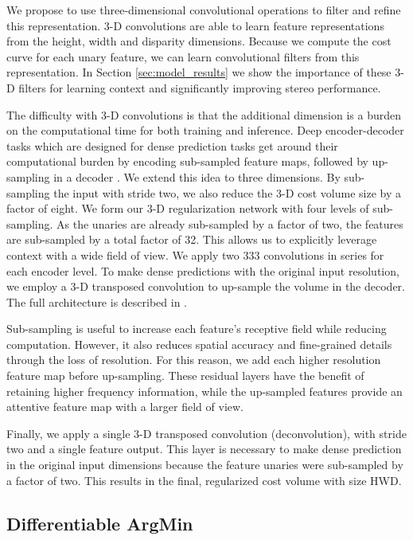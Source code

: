 \documentclass[10pt,twocolumn,letterpaper]{article}
\begin{document}
We propose to use three-dimensional convolutional operations to filter and refine this representation. 3-D convolutions are able to learn feature representations from the height, width and disparity dimensions. Because we compute the cost curve for each unary feature, we can learn convolutional filters from this representation. In Section \ref{sec:model_results} we show the importance of these 3-D filters for learning context and significantly improving stereo performance.



The difficulty with 3-D convolutions is that the additional dimension is a burden on the computational time for both training and inference. Deep encoder-decoder tasks which are designed for dense prediction tasks get around their computational burden by encoding sub-sampled feature maps, followed by up-sampling in a decoder \cite{badrinarayanan2015segnet}. We extend this idea to three dimensions. By sub-sampling the input with stride two, we also reduce the 3-D cost volume size by a factor of eight. We form our 3-D regularization network with four levels of sub-sampling. As the unaries are already sub-sampled by a factor of two, the features are sub-sampled by a total factor of 32. This allows us to explicitly leverage context with a wide field of view. We apply two 333 convolutions in series for each encoder level. To make dense predictions with the original input resolution, we employ a 3-D transposed convolution to up-sample the volume in the decoder. The full architecture is described in .

Sub-sampling is useful to increase each feature's receptive field while reducing computation. However, it also reduces spatial accuracy and fine-grained details through the loss of resolution. For this reason, we add each higher resolution feature map before up-sampling. These residual layers have the benefit of retaining higher frequency information, while the up-sampled features provide an attentive feature map with a larger field of view.

Finally, we apply a single 3-D transposed convolution (deconvolution), with stride two and a single feature output. This layer is necessary to make dense prediction in the original input dimensions because the feature unaries were sub-sampled by a factor of two. This results in the final, regularized cost volume with size HWD.

\subsection{Differentiable ArgMin}
\label{sec:argmin}
\end{document}
